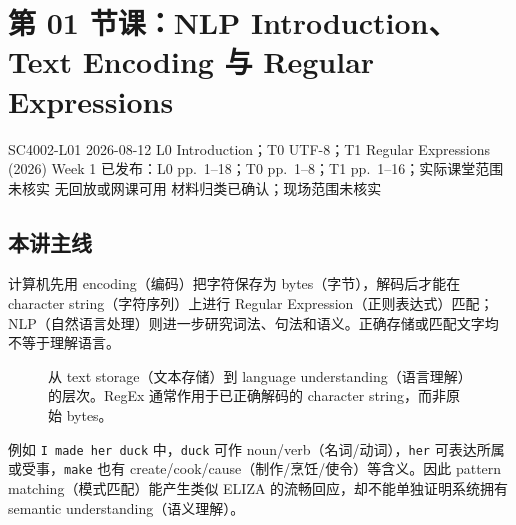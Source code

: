 
\section{第 01 节课：NLP Introduction、Text Encoding 与 Regular Expressions}
\label{lecture:SC4002-L01}

\lecturemeta
  {SC4002-L01}
  {2026-08-12}
  {L0 Introduction；T0 UTF-8；T1 Regular Expressions (2026)}
  {Week 1 已发布：L0 pp.~1--18；T0 pp.~1--8；T1 pp.~1--16；实际课堂范围未核实}
  {无回放或网课可用}
  {材料归类已确认；现场范围未核实}

\subsection{本讲主线}

计算机先用 encoding（编码）把字符保存为 bytes（字节），解码后才能在 character string（字符序列）上进行 Regular Expression（正则表达式）匹配；NLP（自然语言处理）则进一步研究词法、句法和语义。正确存储或匹配文字均不等于理解语言。

\begin{figure}[htbp]
  \centering
  \resizebox{0.94\textwidth}{!}{}
  \caption{从 text storage（文本存储）到 language understanding（语言理解）的层次。RegEx 通常作用于已正确解码的 character string，而非原始 bytes。}
  \label{fig:sc4002-l01-text-levels}
\end{figure}



例如
\texttt{I made her duck} 中，\texttt{duck} 可作 noun/verb（名词/动词），\texttt{her} 可表达所属或受事，\texttt{make} 也有 create/cook/cause（制作/烹饪/使令）等含义。因此 pattern matching（模式匹配）能产生类似 ELIZA 的流畅回应，却不能单独证明系统拥有 semantic understanding（语义理解）。


